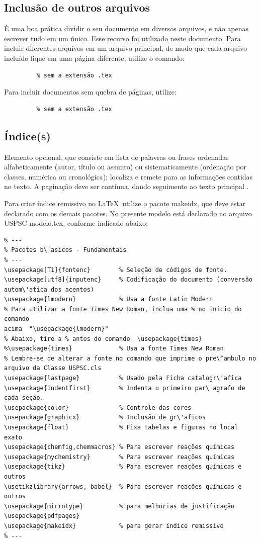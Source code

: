 \subsection{Inclusão de outros arquivos}\label{sec-include}

É uma boa pr\'atica dividir o seu documento em diversos arquivos, e não
apenas escrever tudo em um único. Esse recurso foi utilizado neste
documento. Para incluir diferentes arquivos em um arquivo principal,
de modo que cada arquivo incluído fique em uma p\'agina diferente, utilize o
comando:

\begin{verbatim}
         % sem a extensão .tex
\end{verbatim}

Para incluir documentos sem quebra de p\'aginas, utilize:

\begin{verbatim}
         % sem a extensão .tex
\end{verbatim}
\subsection{Índice(s)}
Elemento  opcional,  que  consiste  em  lista  de  palavras  ou  frases  ordenadas alfabeticamente (autor, título ou assunto) ou sistematicamente (ordenação por classes, num\'erica ou cronológica); localiza e remete para as informações contidas no texto. A paginação deve ser contínua, dando seguimento ao texto principal \cite{aguia2020}.

Para criar índice remissivo no \LaTeX\  utilize o pacote makeidx, que deve estar declarado com os demais pacotes. No presente modelo est\'a declarado no arquivo USPSC-modelo.tex, conforme indicado abaixo:

\begin{verbatim}
% ---
% Pacotes b\'asicos - Fundamentais 
% ---
\usepackage[T1]{fontenc}		% Seleção de códigos de fonte.
\usepackage[utf8]{inputenc}		% Codificação do documento (conversão 
autom\'atica dos acentos)
\usepackage{lmodern}			% Usa a fonte Latin Modern
% Para utilizar a fonte Times New Roman, inclua uma % no início do comando 
acima  "\usepackage{lmodern}"
% Abaixo, tire a % antes do comando  \usepackage{times}
%\usepackage{times}		    	% Usa a fonte Times New Roman	
% Lembre-se de alterar a fonte no comando que imprime o pre\^ambulo no 
arquivo da Classe USPSC.cls				
\usepackage{lastpage}			% Usado pela Ficha catalogr\'afica
\usepackage{indentfirst}		% Indenta o primeiro par\'agrafo de cada seção.
\usepackage{color}				% Controle das cores
\usepackage{graphicx}			% Inclusão de gr\'aficos
\usepackage{float} 				% Fixa tabelas e figuras no local exato
\usepackage{chemfig,chemmacros} % Para escrever reações químicas
\usepackage{mychemistry}        % Para escrever reações químicas
\usepackage{tikz}				% Para escrever reações químicas e outros
\usetikzlibrary{arrows, babel}	% Para escrever reações químicas e outros
\usepackage{microtype} 			% para melhorias de justificação
\usepackage{pdfpages}
\usepackage{makeidx}            % para gerar índice remissivo
% ---
\end{verbatim}

